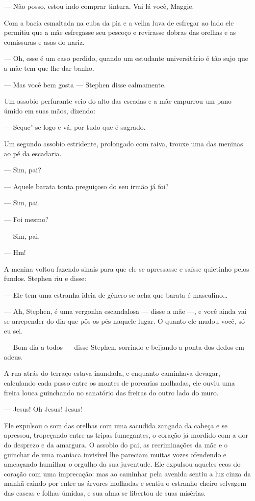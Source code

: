  --- Não posso, estou indo comprar tintura. Vai lá você, Maggie.

Com a bacia esmaltada na cuba da pia e a velha luva de esfregar ao lado
ele permitiu que a mãe esfregasse seu pescoço e revirasse dobras
das orelhas e as comissuras e asas do nariz.

 --- Oh, esse é um caso perdido, quando um estudante universitário é tão
sujo que a mãe tem que lhe dar banho.

 --- Mas você bem gosta --- Stephen disse calmamente.

Um assobio perfurante veio do alto das escadas e a mãe empurrou um pano
úmido em suas mãos, dizendo:

 --- Seque"-se logo e vá, por tudo que é sagrado.

Um segundo assobio estridente, prolongado com raiva, trouxe uma das
meninas ao pé da escadaria.

 --- Sim, pai?

 --- Aquele barata tonta preguiçoso do seu irmão já foi?

 --- Sim, pai.

 --- Foi mesmo?

 --- Sim, pai.

 --- Hm!

A menina voltou fazendo sinais para que ele se apressasse e saísse
quietinho pelos fundos. Stephen riu e disse:

 --- Ele tem uma estranha ideia de gênero se acha que barata é masculino\ldots{}

 --- Ah, Stephen, é uma vergonha escandalosa --- disse a mãe ---, e você ainda vai
se arrepender do dia que pôs os pés naquele lugar. O quanto ele mudou
você, só eu sei.

 --- Bom dia a todos --- disse Stephen, sorrindo e beijando a ponta dos dedos
em adeus.

A rua atrás do terraço estava inundada, e enquanto caminhava devagar,
calculando cada passo entre os montes de porcarias molhadas, ele ouviu
uma freira louca guinchando no sanatório das freiras do outro lado do
muro.

 --- Jesus! Oh Jesus! Jesus!

Ele expulsou o som das orelhas com uma sacudida zangada da cabeça e se
apressou, tropeçando entre as tripas fumegantes, o coração já mordido
com a dor do desprezo e da amargura. O assobio do pai, as recriminações
da mãe e o guinchar de uma maníaca invisível lhe pareciam muitas vozes
ofendendo e ameaçando humilhar o orgulho da sua juventude. Ele expulsou
aqueles ecos do coração com uma imprecação: mas ao caminhar pela
avenida sentiu a luz cinza da manhã caindo por entre as árvores
molhadas e sentiu o estranho cheiro selvagem das cascas e folhas
úmidas, e sua alma se libertou de suas misérias.

